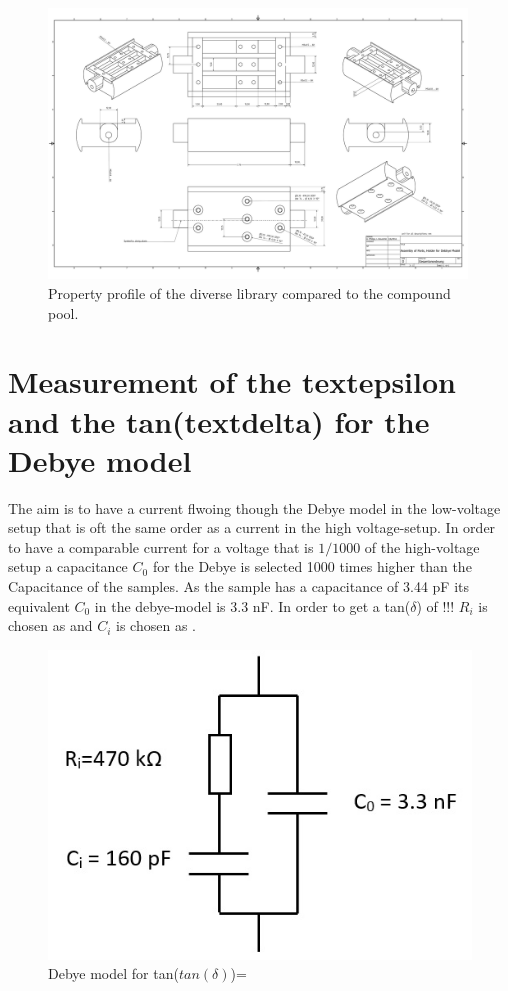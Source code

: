 \newpage

\begin{figure}
\includegraphics[width=0.99\textwidth]{figures/Gesamtanordnung.pdf}
    \caption{Property profile of the diverse library compared to the compound pool.}
    
   \end{figure}	
\newpage
    

\section{Measurement of the textepsilon and the tan(textdelta) for the Debye model}

The aim is to have a current flwoing though the Debye model in the low-voltage setup that is oft the same order as a current in the high voltage-setup. In order to have a comparable current for a voltage that is $1/1000$ of the high-voltage setup a capacitance $C_0$ for the Debye is selected 1000 times higher than the Capacitance of the samples. As the sample has a capacitance of 3.44 pF its equivalent $C_0$ in the debye-model is 3.3 nF. In order to get a tan($\delta$) of !!! $R_i$ is chosen as and $C_i$ is chosen as .
\begin{figure}
	\includegraphics{figures/Methods/debye-modell.jpg}	
	\caption{Debye model for tan($tan(\delta)$)= }	
\end{figure}


